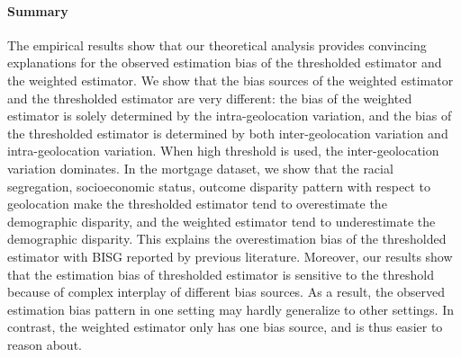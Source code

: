 

\paragraph{Summary}
The empirical results show that our theoretical analysis provides convincing explanations for the observed estimation bias of the thresholded estimator and the weighted estimator. We show that the bias sources of the weighted estimator and the thresholded estimator are very different: the bias of the weighted estimator is solely determined by the intra-geolocation variation, and the bias of the thresholded estimator is determined by both inter-geolocation variation and intra-geolocation variation. When high threshold is used, the inter-geolocation variation dominates.
In the mortgage dataset, we show that the racial segregation, socioeconomic status, outcome disparity pattern with respect to geolocation make the thresholded estimator tend to overestimate the demographic disparity, and the weighted estimator tend to underestimate the demographic disparity.
This explains the overestimation bias of the thresholded estimator with BISG reported by previous literature.
Moreover, our results show that the estimation bias of thresholded estimator is sensitive to the threshold because of complex interplay of different bias sources.
As a result, the observed estimation bias pattern in one setting may hardly generalize to other settings.
In contrast, the weighted estimator only has one bias source, and is thus easier to reason about. 




